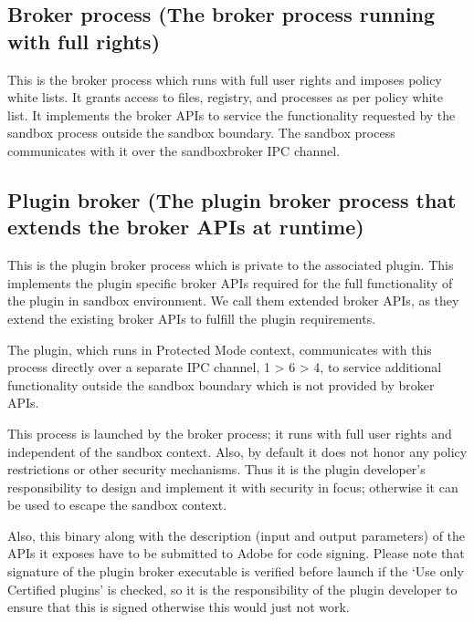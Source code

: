 \documentclass[letterpaper,12pt,english,openany,oneside]{sphinxmanual}
\begin{document}
\subsection{Broker process (The broker process running with full rights)}
\label{\detokenize{SandboxBrokerExt:broker-process-the-broker-process-running-with-full-rights}}
This is the broker process which runs with full user rights and imposes policy white lists. It grants access to files, registry, and processes as per policy white list. It implements the broker APIs to service the functionality requested by the sandbox process outside the sandbox boundary. The sandbox process communicates with it over the sandbox\sphinxhyphen{}broker IPC channel.


\subsection{Plugin broker (The plugin broker process that extends the broker APIs at runtime)}
\label{\detokenize{SandboxBrokerExt:plugin-broker-the-plugin-broker-process-that-extends-the-broker-apis-at-runtime}}
This is the plugin broker process which is private to the associated plug\sphinxhyphen{}in. This implements the plug\sphinxhyphen{}in specific broker APIs required for the full functionality of the plug\sphinxhyphen{}in in sandbox environment. We call them extended broker APIs, as they extend the existing broker APIs to fulfill the plug\sphinxhyphen{}in requirements.

The plug\sphinxhyphen{}in, which runs in Protected Mode context, communicates with this process directly over a separate IPC channel, 1 \sphinxhyphen{}> 6 \sphinxhyphen{}> 4, to service additional functionality outside the sandbox boundary which is not provided by broker APIs.

This process is launched by the broker process; it runs with full user rights and independent of the sandbox context. Also, by default it does not honor any policy restrictions or other security mechanisms. Thus it is the plug\sphinxhyphen{}in developer’s responsibility to design and implement it with security in focus; otherwise it can be used to escape the sandbox context.

Also, this binary along with the description (input and output parameters) of the APIs it exposes have to be submitted to Adobe for code signing. Please note that signature of the plug\sphinxhyphen{}in broker executable is verified before launch if the ‘Use only Certified plug\sphinxhyphen{}ins’ is checked, so it is the responsibility of the plug\sphinxhyphen{}in developer to ensure that this is signed otherwise this would just not work.
\end{document}
